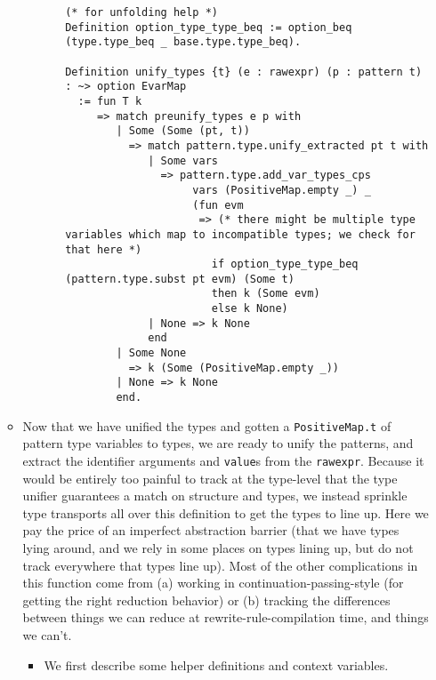 \documentclass[
]{article}
\begin{document}
\begin{itemize}
\begin{itemize}
\begin{itemize}
\begin{itemize}
\begin{verbatim}
(* for unfolding help *)
Definition option_type_type_beq := option_beq (type.type_beq _ base.type.type_beq).

Definition unify_types {t} (e : rawexpr) (p : pattern t) : ~> option EvarMap
  := fun T k
     => match preunify_types e p with
        | Some (Some (pt, t))
          => match pattern.type.unify_extracted pt t with
             | Some vars
               => pattern.type.add_var_types_cps
                    vars (PositiveMap.empty _) _
                    (fun evm
                     => (* there might be multiple type variables which map to incompatible types; we check for that here *)
                       if option_type_type_beq (pattern.type.subst pt evm) (Some t)
                       then k (Some evm)
                       else k None)
             | None => k None
             end
        | Some None
          => k (Some (PositiveMap.empty _))
        | None => k None
        end.
\end{verbatim}
      \end{itemize}
    \end{itemize}
  \item
    Now that we have unified the types and gotten a
    \texttt{PositiveMap.t} of pattern type variables to types, we are
    ready to unify the patterns, and extract the identifier arguments
    and \texttt{value}s from the \texttt{rawexpr}. Because it would be
    entirely too painful to track at the type-level that the type
    unifier guarantees a match on structure and types, we instead
    sprinkle type transports all over this definition to get the types
    to line up. Here we pay the price of an imperfect abstraction
    barrier (that we have types lying around, and we rely in some places
    on types lining up, but do not track everywhere that types line up).
    Most of the other complications in this function come from (a)
    working in continuation-passing-style (for getting the right
    reduction behavior) or (b) tracking the differences between things
    we can reduce at rewrite-rule-compilation time, and things we can't.

    \begin{itemize}
    \item
      We first describe some helper definitions and context variables.


\end{itemize}
\end{itemize}
\end{itemize}
\end{document}
